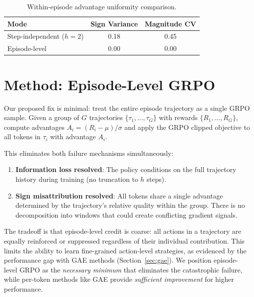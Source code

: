 \documentclass[11pt]{article}
\begin{document}
\begin{table}[h]
\centering
\caption{Within-episode advantage uniformity comparison.}
\label{tab:sign_control}
\begin{tabular}{lcc}
\toprule
Mode & Sign Variance & Magnitude CV \\
\midrule
Step-independent ($h=2$) & 0.18 & 0.45 \\
Episode-level & 0.00 & 0.00 \\
\bottomrule
\end{tabular}
\end{table}

\section{Method: Episode-Level GRPO}
\label{sec:method}

Our proposed fix is minimal: treat the entire episode trajectory as a single GRPO sample. Given a group of $G$ trajectories $\{\tau_1, \ldots, \tau_G\}$ with rewards $\{R_1, \ldots, R_G\}$, compute advantages $A_i = (R_i - \mu) / \sigma$ and apply the GRPO clipped objective to all tokens in $\tau_i$ with advantage $A_i$.

This eliminates both failure mechanisms simultaneously:
\begin{enumerate}
    \item \textbf{Information loss resolved}: The policy conditions on the full trajectory history during training (no truncation to $h$ steps).
    \item \textbf{Sign misattribution resolved}: All tokens share a single advantage determined by the trajectory's relative quality within the group. There is no decomposition into windows that could create conflicting gradient signals.
\end{enumerate}

The tradeoff is that episode-level credit is coarse: all actions in a trajectory are equally reinforced or suppressed regardless of their individual contribution. This limits the ability to learn fine-grained action-level strategies, as evidenced by the performance gap with GAE methods (Section~\ref{sec:gae}). We position episode-level GRPO as the \emph{necessary minimum} that eliminates the catastrophic failure, while per-token methods like GAE provide \emph{sufficient improvement} for higher performance.
\end{document}
